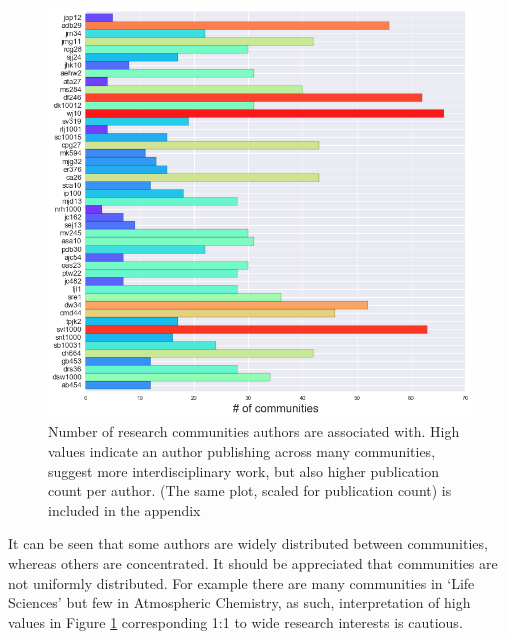 \begin{center}
\begin{figure}[H]
\label{fig:commbar}
  \centering
    \includegraphics[width=\textwidth]{Analysis/community_detection.png}
    \caption{Number of research communities authors are associated with. High values indicate an author publishing across many communities, suggest more interdisciplinary work, but also higher publication count per author. (The same plot, scaled for publication count) is included in the appendix}
\end{figure} 
\end{center}
It can be seen that some authors are widely distributed between communities, whereas others are concentrated.
It should be appreciated that communities are not uniformly distributed. For example there are many communities in `Life Sciences' but few in Atmospheric Chemistry, as such, interpretation of high values in Figure \ref{fig:commbar} corresponding 1:1 to wide research interests is cautious.

